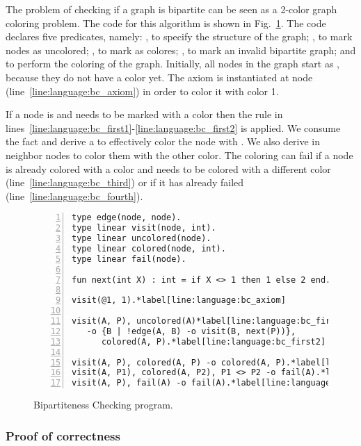 The problem of checking if a graph is bipartite can be seen as a 2-color graph
coloring problem. The code for this algorithm is shown in
Fig.~\ref{language:code:bichecking}. The code declares five predicates, namely:
, to specify the structure of the graph; , to mark
nodes as uncolored; , to mark as colores; , to mark an
invalid bipartite graph; and  to perform the coloring of the graph.
Initially, all nodes in the graph start as , because they do not
have a color yet. The axiom  is instantiated at node
 (line~\ref{line:language:bc_axiom}) in order to color it with color 1.

If a node is  and needs to be marked with a color  then
the rule in lines~\ref{line:language:bc_first1}-\ref{line:language:bc_first2} is
applied. We consume the  fact and derive a 
to effectively color the node with . We also derive  in neighbor nodes to color them with the other color.  The coloring
can fail if a node is already colored with a color  and needs to be
colored with a different color (line~\ref{line:language:bc_third}) or if it has
already failed (line~\ref{line:language:bc_fourth}).

\begin{figure}[h!]
\begin{Verbatim}[numbers=left,fontsize=\codesize,commandchars=\*\[\]]
type edge(node, node).
type linear visit(node, int).
type linear uncolored(node).
type linear colored(node, int).
type linear fail(node).

fun next(int X) : int = if X <> 1 then 1 else 2 end.

visit(@1, 1).*label[line:language:bc_axiom]

visit(A, P), uncolored(A)*label[line:language:bc_first1]
   -o {B | !edge(A, B) -o visit(B, next(P))},
      colored(A, P).*label[line:language:bc_first2]

visit(A, P), colored(A, P) -o colored(A, P).*label[line:language:bc_second]
visit(A, P1), colored(A, P2), P1 <> P2 -o fail(A).*label[line:language:bc_third]
visit(A, P), fail(A) -o fail(A).*label[line:language:bc_fourth]
\end{Verbatim}
  \caption{Bipartiteness Checking program.}
  \label{language:code:bichecking}
\end{figure}

\subsubsection{Proof of correctness}

